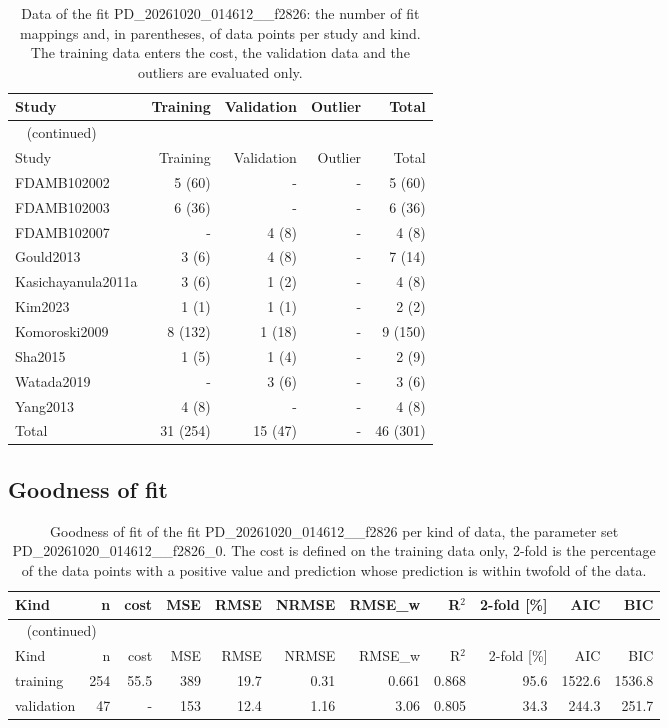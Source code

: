 \documentclass{article}
\begin{document}
\begin{longtable}{lrrrr}
\caption{Data of the fit PD\_20261020\_014612\_\_f2826: the number of fit mappings and, in parentheses, of data points per study and kind. The training data enters the cost, the validation data and the outliers are evaluated only.}\label{tab:data:PD_20261020_014612__f2826} \\
\toprule
Study & Training & Validation & Outlier & Total \\
\midrule
\endfirsthead
\multicolumn{5}{l}{\small\tablename~\thetable{} (continued)} \\
\toprule
Study & Training & Validation & Outlier & Total \\
\midrule
\endhead
\bottomrule
\endlastfoot
FDAMB102002 & 5 (60) & - & - & 5 (60) \\
FDAMB102003 & 6 (36) & - & - & 6 (36) \\
FDAMB102007 & - & 4 (8) & - & 4 (8) \\
Gould2013 & 3 (6) & 4 (8) & - & 7 (14) \\
Kasichayanula2011a & 3 (6) & 1 (2) & - & 4 (8) \\
Kim2023 & 1 (1) & 1 (1) & - & 2 (2) \\
Komoroski2009 & 8 (132) & 1 (18) & - & 9 (150) \\
Sha2015 & 1 (5) & 1 (4) & - & 2 (9) \\
Watada2019 & - & 3 (6) & - & 3 (6) \\
Yang2013 & 4 (8) & - & - & 4 (8) \\
Total & 31 (254) & 15 (47) & - & 46 (301) \\
\end{longtable}

\subsection{Goodness of fit}

\begin{longtable}{lrrrrrrrrrr}
\caption{Goodness of fit of the fit PD\_20261020\_014612\_\_f2826 per kind of data, the parameter set PD\_20261020\_014612\_\_f2826\_0. The cost is defined on the training data only, 2-fold is the percentage of the data points with a positive value and prediction whose prediction is within twofold of the data.}\label{tab:metrics:PD_20261020_014612__f2826} \\
\toprule
Kind & n & cost & MSE & RMSE & NRMSE & RMSE\_w & R\ensuremath{^{2}} & 2-fold [\%] & AIC & BIC \\
\midrule
\endfirsthead
\multicolumn{11}{l}{\small\tablename~\thetable{} (continued)} \\
\toprule
Kind & n & cost & MSE & RMSE & NRMSE & RMSE\_w & R\ensuremath{^{2}} & 2-fold [\%] & AIC & BIC \\
\midrule
\endhead
\bottomrule
\endlastfoot
training & 254 & 55.5 & 389 & 19.7 & 0.31 & 0.661 & 0.868 & 95.6 & 1522.6 & 1536.8 \\
validation & 47 & - & 153 & 12.4 & 1.16 & 3.06 & 0.805 & 34.3 & 244.3 & 251.7 \\
\end{longtable}
\end{document}
